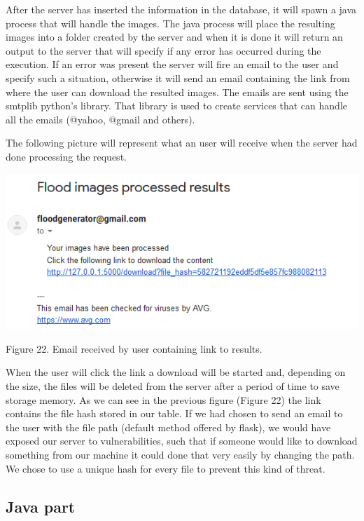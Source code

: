 \documentclass[12pt, a4paper]{report}
\begin{document}
After the server has inserted the information in the database, it will spawn a java process that will handle the images. The java process will place the resulting images into a folder created by the server and when it is done it will return an output to the server that will specify if any error has occurred during the execution. If an error was present the server will fire an email to the user and specify such a situation, otherwise it will send an email containing the link from where the user can download the resulted images. The emails are sent using the smtplib python's library. That library is used to create services that can handle all the emails (@yahoo, @gmail and others).
\par 

The following picture will represent what an user will receive when the server had done processing the request.

\medskip
\includegraphics[scale=1, center]{receive_email.png}
\begin{center}
Figure 22. Email received by user containing link to results.
\end{center}
\par 

When the user will click the link a download will be started and, depending on the size, the files will be deleted from the server after a period of time to save storage memory. As we can see in the previous figure (Figure 22) the link contains the file hash stored in our table. If we had chosen to send an email to the user with the file path (default method offered by flask), we would have exposed our server to vulnerabilities, such that if someone would like to download something from our machine it could done that very easily by changing the path. We chose to use a unique hash for every file to prevent this kind of threat.

\subsection{Java part}
\end{document}
